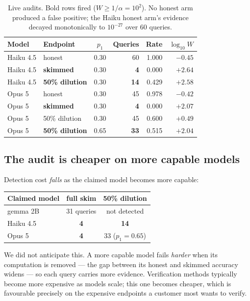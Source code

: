 \documentclass[11pt]{article}
\theoremstyle{definition}
\begin{document}
\begin{table}[t]
\centering
\begin{tabular}{llcrrr}
\toprule
Model & Endpoint & $p_1$ & Queries & Rate & $\log_{10} W$ \\
\midrule
Haiku 4.5 & honest         & 0.30 & 60 & 1.000 & $-0.45$ \\
Haiku 4.5 & \textbf{skimmed} & 0.30 & \textbf{4}  & 0.000 & $+2.64$ \\
Haiku 4.5 & \textbf{50\% dilution} & 0.30 & \textbf{14} & 0.429 & $+2.58$ \\
\midrule
Opus 5 & honest            & 0.30 & 45 & 0.978 & $-0.42$ \\
Opus 5 & \textbf{skimmed}  & 0.30 & \textbf{4}  & 0.000 & $+2.07$ \\
Opus 5 & 50\% dilution     & 0.30 & 45 & 0.600 & $+0.49$ \\
Opus 5 & \textbf{50\% dilution} & 0.65 & \textbf{33} & 0.515 & $+2.04$ \\
\bottomrule
\end{tabular}
\caption{Live audits. Bold rows fired ($W \ge 1/\alpha = 10^2$). No honest arm
produced a false positive; the Haiku honest arm's evidence decayed monotonically
to $10^{-27}$ over 60 queries.}
\label{tab:frontier}
\end{table}

\subsection{The audit is cheaper on more capable models}

Detection cost \emph{falls} as the claimed model becomes more capable:

\begin{center}
\begin{tabular}{lcc}
\toprule
Claimed model & full skim & 50\% dilution \\
\midrule
gemma 2B    & 31 queries & not detected \\
Haiku 4.5   & \textbf{4} & \textbf{14} \\
Opus 5      & \textbf{4} & 33 ($p_1 = 0.65$) \\
\bottomrule
\end{tabular}
\end{center}

\noindent We did not anticipate this. A more capable model fails \emph{harder}
when its computation is removed --- the gap between its honest and skimmed
accuracy widens --- so each query carries more evidence. Verification methods
typically become more expensive as models scale; this one becomes cheaper,
which is favourable precisely on the expensive endpoints a customer most wants
to verify.
\end{document}
